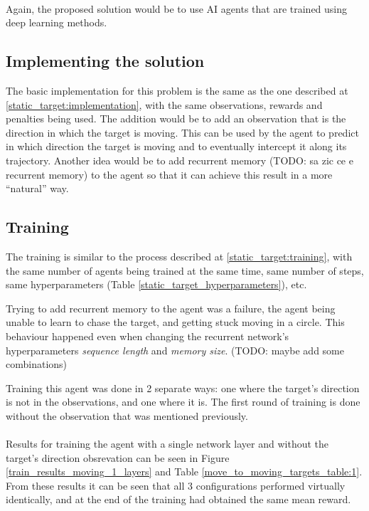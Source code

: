 \paragraph{}
Again, the proposed solution would be to use AI agents that are trained using deep learning methods.

\subsection{Implementing the solution} \label{moving_target:implementation}
The basic implementation for this problem is the same as the one described at \ref{static_target:implementation}, with the same observations, rewards and penalties being used. The addition would be to add an observation that is the direction in which the target is moving. This can be used by the agent to predict in which direction the target is moving and to eventually intercept it along its trajectory. Another idea would be to add recurrent memory (TODO: sa zic ce e recurrent memory) to the agent so that it can achieve this result in a more \enquote{natural} way.

\subsection{Training} \label{moving_target:training}
The training is similar to the process described at \ref{static_target:training}, with the same number of agents being trained at the same time, same number of steps, same hyperparameters (Table \ref{static_target_hyperparameters}), etc. 

Trying to add recurrent memory to the agent was a failure, the agent being unable to learn to chase the target, and getting stuck moving in a circle. This behaviour happened even when changing the recurrent network's hyperparameters \emph{sequence length} and \emph{memory size}. (TODO: maybe add some combinations)

Training this agent was done in 2 separate ways: one where the target's direction is not in the observations, and one where it is. The first round of training is done without the observation that was mentioned previously.

\paragraph{}
Results for training the agent with a single network layer and without the target's direction obsrevation can be seen in Figure \ref{train_results_moving_1_layers} and Table \ref{move_to_moving_targets_table:1}. From these results it can be seen that all 3 configurations performed virtually identically, and at the end of the training had obtained the same mean reward.

